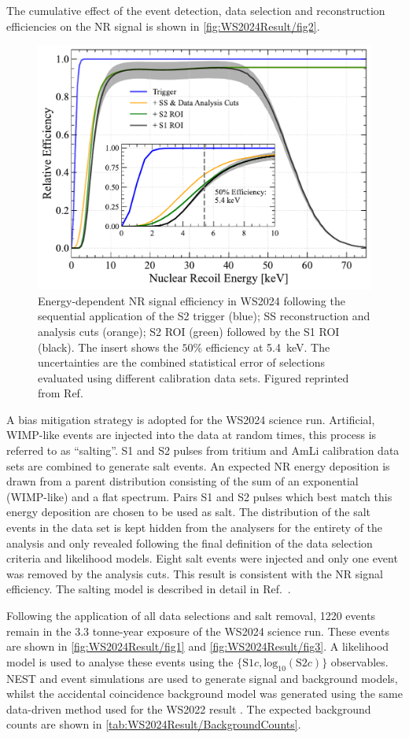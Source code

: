 The cumulative effect of the event detection, data selection and reconstruction efficiencies on the NR signal is shown in \autoref{fig:WS2024Result/fig2}.
\begin{figure}[t!]
    \centering
    \includegraphics[width=0.7\linewidth]{figures/WS2024Result/figure2.pdf}
    \caption{Energy-dependent NR signal efficiency in WS2024 following the sequential application of the S2 trigger (blue); SS reconstruction and analysis cuts (orange); S2 ROI (green) followed by the S1 ROI (black). The insert shows the $50\%$ efficiency at 5.4~keV. The uncertainties are the combined statistical error of selections evaluated using different calibration data sets. Figured reprinted from Ref.~\cite{LZCollaboration:2024lux}}
    \label{fig:WS2024Result/fig2}
\end{figure}
A bias mitigation strategy is adopted for the WS2024 science run. Artificial, WIMP-like events are injected into the data at random times, this process is referred to as ``salting''. S1 and S2 pulses from tritium and AmLi calibration data sets are combined to generate salt events. An expected NR energy deposition is drawn from a parent distribution consisting of the sum of an exponential (WIMP-like) and a flat spectrum. Pairs S1 and S2 pulses which best match this energy deposition are chosen to be used as salt. The distribution of the salt events in the data set is kept hidden from the analysers for the entirety of the analysis and only revealed following the final definition of the data selection criteria and likelihood models. Eight salt events were injected and only one event was removed by the analysis cuts. This result is consistent with the NR signal efficiency. The salting model is described in detail in Ref.~\cite{LZCollaboration:2024lux}.

Following the application of all data selections and salt removal, 1220 events remain in the 3.3 tonne-year exposure of the WS2024 science run. These events are shown in \autoref{fig:WS2024Result/fig1} and \autoref{fig:WS2024Result/fig3}. A likelihood model is used to analyse these events using the $\{\text{S1}c,\text{log}_{10}(\text{S2}c)\}$ observables. NEST and event simulations \cite{LZ_SIMS} are used to generate signal and background models, whilst the accidental coincidence background model was generated using the same data-driven method used for the WS2022 result \cite{LZ:2022lsv}. The expected background counts are shown in \autoref{tab:WS2024Result/BackgroundCounts}.

